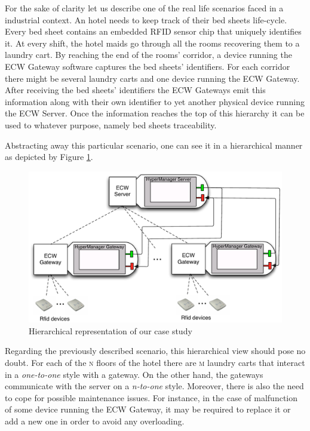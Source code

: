 	
	For the sake of clarity let us describe one of the real life scenarios faced in a industrial 
	context. An hotel needs to keep track of 
	their bed sheets life-cycle. Every bed sheet contains an embedded \ac{RFID} 
	sensor chip that uniquely identifies it. At every shift, the hotel maids go through all the rooms recovering them to a 
	laundry cart. By reaching the end of the rooms' corridor, a device running the 
	\ac{ECW} \textsf{Gateway} software captures the  bed sheets' identifiers. For each corridor there might be several
	laundry carts and one device running the \textsf{ECW Gateway}. 
	After receiving the bed sheets' identifiers the \ac{ECW} \textsf{Gateway}s  emit
	this information along with their own identifier to yet another physical device running the \textsf{ECW Server}. 
	Once the information reaches the top of this hierarchy it can be used to whatever purpose, namely 
	bed sheets traceability.
    		
	Abstracting away this particular scenario, one can see it in a hierarchical manner as depicted by 
	Figure \ref{fig:hierarchy}.
	
	\begin{figure}[H]
		\centering
		\includegraphics[scale=0.5]{figures/chapter3/architecture.pdf}
		\caption{Hierarchical representation of our case study}		
		\label{fig:hierarchy}
	\end{figure}

		
	Regarding the previously described scenario, this hierarchical view should pose no doubt.
	For each of the \textsc{n} floors of the hotel there are \textsc{m} laundry carts that interact in
	a \textit{one-to-one} style with a gateway.	On the other hand, the gateways communicate 
	with the server on a \textit{n-to-one} style. Moreover, there is also the need to cope for possible 
	maintenance issues. For instance, in the case of malfunction of some device running the \ac{ECW} \textsf{Gateway},
	it may be required to replace it or add a new one in order to avoid any overloading.
	 		 
